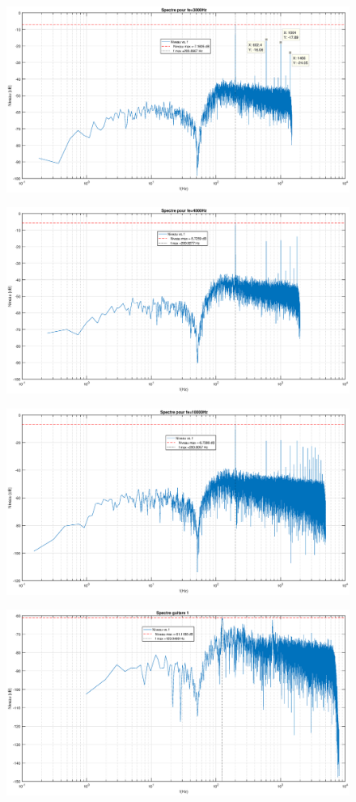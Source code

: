\documentclass[12pt,a4paper]{article}
\begin{document}
\begin{figure}
	\centering
	\includegraphics[width=0.7\linewidth]{"res/echantillonnage 3000Hz"}
	\caption{}
	\label{fig:echantillonnage-3000hz}
\end{figure}
\begin{figure}
	\centering
	\includegraphics[width=0.7\linewidth]{"res/echantillonnage 4000Hz"}
	\caption{}
	\label{fig:echantillonnage-4000hz}
\end{figure}
\begin{figure}
	\centering
	\includegraphics[width=0.7\linewidth]{"res/echantillonnage 10000Hz"}
	\caption{}
	\label{fig:echantillonnage-10000hz}
\end{figure}
\begin{figure}
	\centering
	\includegraphics[width=0.7\linewidth]{"res/guitare 0"}
	\caption{}
	\label{fig:guitare-0}
\end{figure}
\end{document}
